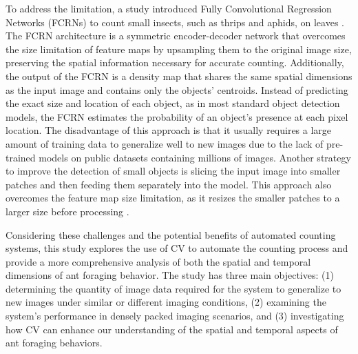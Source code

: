 To address the limitation, a study introduced Fully Convolutional Regression Networks (FCRNs) to count small insects, such as thrips and aphids, on leaves \cite{bereciartua-perez_multiclass_2023}. The FCRN architecture is a symmetric encoder-decoder network that overcomes the size limitation of feature maps by upsampling them to the original image size, preserving the spatial information necessary for accurate counting. Additionally, the output of the FCRN is a density map that shares the same spatial dimensions as the input image and contains only the objects’ centroids. Instead of predicting the exact size and location of each object, as in most standard object detection models, the FCRN estimates the probability of an object’s presence at each pixel location. The disadvantage of this approach is that it usually requires a large amount of training data to generalize well to new images due to the lack of pre-trained models on public datasets containing millions of images. Another strategy to improve the detection of small objects is slicing the input image into smaller patches and then feeding them separately into the model. This approach also overcomes the feature map size limitation, as it resizes the smaller patches to a larger size before processing \cite{hong_automatic_2021,bereciartua-perez_multiclass_2023}. 
    
Considering these challenges and the potential benefits of automated counting systems, this study explores the use of CV to automate the counting process and provide a more comprehensive analysis of both the spatial and temporal dimensions of ant foraging behavior. The study has three main objectives: (1) determining the quantity of image data required for the system to generalize to new images under similar or different imaging conditions, (2) examining the system’s performance in densely packed imaging scenarios, and (3) investigating how CV can enhance our understanding of the spatial and temporal aspects of ant foraging behaviors.
